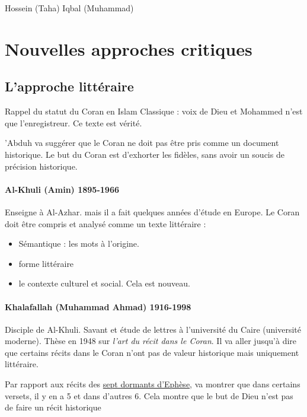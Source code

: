  Hossein (Taha) Iqbal (Muhammad)

 

 
  
\section{Nouvelles approches critiques}

\subsection{L’approche littéraire}

Rappel du statut du Coran en Islam Classique : voix de Dieu et Mohammed n'est que l'enregistreur. Ce texte est vérité.

'Abduh va suggérer que le Coran ne doit pas être pris comme un document historique. Le but du Coran est d'exhorter les fidèles, sans avoir un soucis de précision historique.

\paragraph{Al-Khuli (Amin) 1895-1966} Enseigne à Al-Azhar. mais il a fait quelques années d'étude en Europe. Le Coran doit être compris et analysé comme un texte littéraire : 
\begin{itemize}
    \item Sémantique : les mots à l'origine. 
    \item forme littéraire
    \item le contexte culturel et social. Cela est nouveau.
\end{itemize}

\paragraph{Khalafallah (Muhammad Ahmad) 1916-1998 } Disciple de Al-Khuli. Savant et étude de lettres à l'université du Caire (université moderne). Thèse en 1948 sur \textit{l'art du récit dans le Coran}. Il va aller jusqu'à dire que certains récits dans le Coran n'ont pas de valeur historique mais uniquement littéraire. 

\begin{Ex}
Par rapport aux récits des \href{https://fr.wikipedia.org/wiki/Sept_Dormants_d\%27\%C3\%89ph\%C3\%A8se#:~:text=Les\%20Sept\%20Dormants\%20d'\%C3\%89ph\%C3\%A8se,r\%C3\%A9cit\%20au\%20contexte\%20arabo\%2Dmusulman.}{sept dormants d'Ephèse}, va montrer que dans certains versets, il y en a 5 et dans d'autres 6. Cela montre que le but de Dieu n'est pas de faire un récit historique
\end{Ex}

